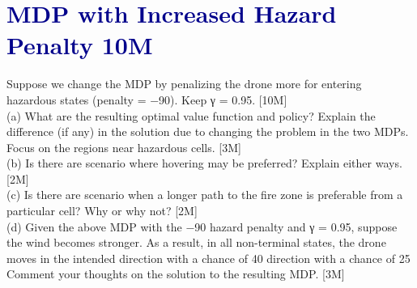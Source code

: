 \section{\textcolor{DarkBlue}{\; MDP with Increased Hazard Penalty \hfill \colorbox{orange!20}{\small 10M}}}

\begin{questionbox}
Suppose we change the MDP by penalizing the drone more for entering hazardous
states (penalty = −90). Keep γ = 0.95. [10M] \\
(a) What are the resulting optimal value function and policy? Explain the difference
(if any) in the solution due to changing the problem in the two MDPs. Focus on
the regions near hazardous cells. [3M] \\
(b) Is there are scenario where hovering may be preferred? Explain either ways. [2M] \\
(c) Is there are scenario when a longer path to the fire zone is preferable from a
particular cell? Why or why not? [2M] \\
(d) Given the above MDP with the −90 hazard penalty and γ = 0.95, suppose the
wind becomes stronger. As a result, in all non-terminal states, the drone moves
in the intended direction with a chance of 40%
direction with a chance of 25%
Comment your thoughts on the solution to the resulting MDP. [3M]
\end{questionbox}

